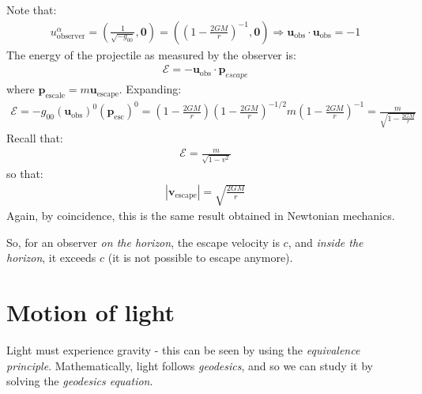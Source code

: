 \documentclass[../template.tex]{subfiles}
\begin{document}
Note that:
\begin{align*}
    u^\alpha_{\mathrm{observer} } = \left(\frac{1}{\sqrt{-g_{00}}}, \bm{0} \right) = \left(\left(1-\frac{2GM}{r} \right)^{-1}, \bm{0}\right) \Rightarrow \bm{u}_{\mathrm{obs} }\cdot \bm{u}_{\mathrm{obs} } = -1
\end{align*}
The energy of the projectile as measured by the observer is:
\begin{align*}
    \mathcal{E} = -\bm{u}_{\mathrm{obs} } \cdot \bm{p}_{escape}
\end{align*}
where $\bm{p}_{\mathrm{escale} } = m \bm{u}_{\mathrm{escape}}$. Expanding:
\begin{align*}
    \mathcal{E} = -g_{00} (\bm{u}_{\mathrm{obs} })^0 (\bm{p}_{\mathrm{esc} })^0 = \left(1-\frac{2GM}{r} \right)\left(1-\frac{2GM}{r} \right)^{-1/2} m \left(1-\frac{2GM}{r} \right)^{-1} = \frac{m}{\displaystyle \sqrt{1-\frac{2GM}{r} }}  
\end{align*}
Recall that:
\begin{align*}
    \mathcal{E}= \frac{m}{\sqrt{1-v^2}} 
\end{align*} 
so that:
\begin{align*}
    |\bm{v}_{\mathrm{escape} }| = \sqrt{\frac{2GM}{r} } 
\end{align*}
Again, by coincidence, this is the same result obtained in Newtonian mechanics. 

So, for an observer \textit{on the horizon}, the escape velocity is $c$, and \textit{inside the horizon}, it exceeds $c$ (it is not possible to escape anymore). 

\section{Motion of light}
Light must experience gravity - this can be seen by using the \textit{equivalence principle}. Mathematically, light follows \textit{geodesics}, and so we can study it by solving the \textit{geodesics equation}.
\end{document}
